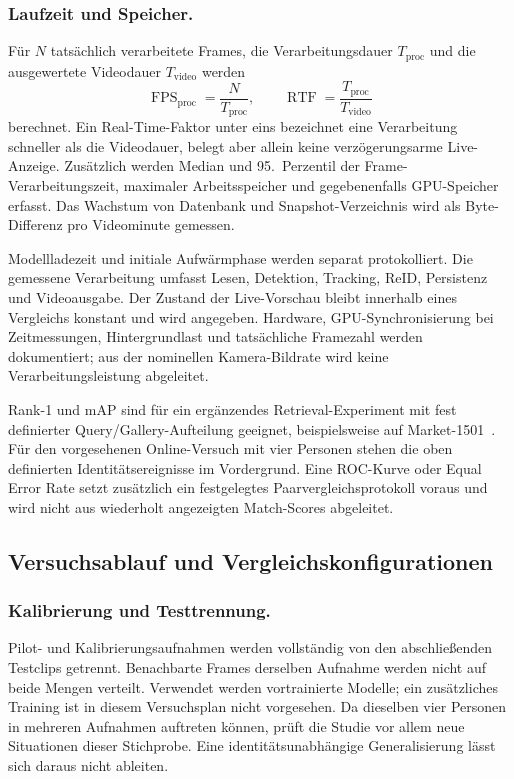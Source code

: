 \documentclass[runningheads]{llncs}
\begin{document}
\subsubsection{Laufzeit und Speicher.}
Für $N$ tatsächlich verarbeitete Frames, die Verarbeitungsdauer $T_{\mathrm{proc}}$ und die ausgewertete Videodauer $T_{\mathrm{video}}$ werden
\begin{equation}
\operatorname{FPS}_{\mathrm{proc}}=\frac{N}{T_{\mathrm{proc}}},
\qquad
\operatorname{RTF}=\frac{T_{\mathrm{proc}}}{T_{\mathrm{video}}}
\label{eq:eval-runtime}
\end{equation}
berechnet. Ein Real-Time-Faktor unter eins bezeichnet eine Verarbeitung schneller als die Videodauer, belegt aber allein keine verzögerungsarme Live-Anzeige. Zusätzlich werden Median und 95.~Perzentil der Frame-Verarbeitungszeit, maximaler Arbeitsspeicher und gegebenenfalls GPU-Speicher erfasst. Das Wachstum von Datenbank und Snapshot-Verzeichnis wird als Byte-Differenz pro Videominute gemessen.

Modellladezeit und initiale Aufwärmphase werden separat protokolliert. Die gemessene Verarbeitung umfasst Lesen, Detektion, Tracking, ReID, Persistenz und Videoausgabe. Der Zustand der Live-Vorschau bleibt innerhalb eines Vergleichs konstant und wird angegeben. Hardware, GPU-Synchronisierung bei Zeitmessungen, Hintergrundlast und tatsächliche Framezahl werden dokumentiert; aus der nominellen Kamera-Bildrate wird keine Verarbeitungsleistung abgeleitet.

Rank-1 und mAP sind für ein ergänzendes Retrieval-Experiment mit fest definierter Query/Gallery-Aufteilung geeignet, beispielsweise auf Market-1501~\cite{zheng2015market1501}. Für den vorgesehenen Online-Versuch mit vier Personen stehen die oben definierten Identitätsereignisse im Vordergrund. Eine ROC-Kurve oder Equal Error Rate setzt zusätzlich ein festgelegtes Paarvergleichsprotokoll voraus und wird nicht aus wiederholt angezeigten Match-Scores abgeleitet.

\subsection{Versuchsablauf und Vergleichskonfigurationen}

\subsubsection{Kalibrierung und Testtrennung.}
Pilot- und Kalibrierungsaufnahmen werden vollständig von den abschließenden Testclips getrennt. Benachbarte Frames derselben Aufnahme werden nicht auf beide Mengen verteilt. Verwendet werden vortrainierte Modelle; ein zusätzliches Training ist in diesem Versuchsplan nicht vorgesehen. Da dieselben vier Personen in mehreren Aufnahmen auftreten können, prüft die Studie vor allem neue Situationen dieser Stichprobe. Eine identitätsunabhängige Generalisierung lässt sich daraus nicht ableiten.
\end{document}
